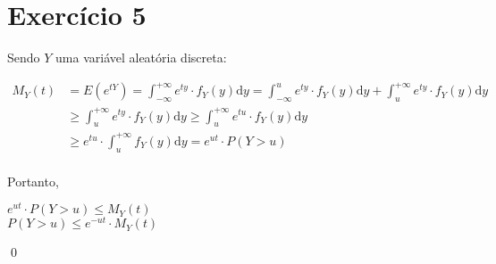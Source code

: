 \documentclass[12pt,letterpaper]{article}
\begin{document}
	\section*{Exercício 5}
	
	Sendo $Y$ uma variável aleatória discreta:
	
	\begin{equation*}
		\begin{split}
			M_Y(t) & = E(e^{tY}) = \int_{-\infty}^{+\infty} e^{ty} \cdot f_Y(y)\text{d}y = \int_{-\infty}^{u} e^{ty} \cdot f_Y(y)\text{d}y + \int_{u}^{+\infty} e^{ty} \cdot f_Y(y)\text{d}y \\
			& \geq \int_{u}^{+\infty} e^{ty} \cdot f_Y(y)\text{d}y \geq \int_{u}^{+\infty} e^{tu} \cdot f_Y(y)\text{d}y \\
			& \geq e^{tu} \cdot \int_{u}^{+\infty} f_Y(y)\text{d}y = e^{ut} \cdot P(Y > u)\\
		\end{split}
	\end{equation*}
	
	Portanto,
	
	\begin{center}
		$e^{ut} \cdot P(Y > u) \leq M_Y(t)$ \\
		$P(Y > u) \leq e^{-ut} \cdot M_Y(t)$ \\
	\end{center}
	 
	\qed 
	 
\end{document}
